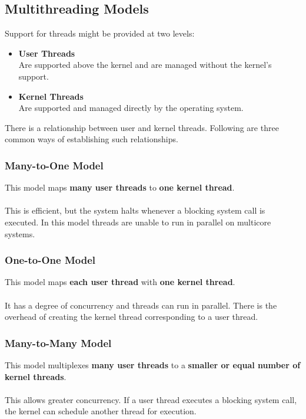 \documentclass{article}
\begin{document}
\subsection{Multithreading Models}
Support for threads might be provided at two levels:

\begin{itemize}
	\item \textbf{User Threads}
	\vspace{.2cm} \\
	Are supported above the kernel and are managed without the kernel's support.
	
	\item \textbf{Kernel Threads}
	\vspace{.2cm} \\
	Are supported and managed directly by the operating system.
\end{itemize}
There is a relationship between user and kernel threads. Following are three common ways of establishing such relationships.

\subsubsection{Many-to-One Model}
This model maps \textbf{many user threads} to \textbf{one kernel thread}. \\ \\
This is efficient, but the system halts whenever a blocking system call is executed. In this model threads are unable to run in parallel on multicore systems.

\subsubsection{One-to-One Model}
This model maps \textbf{each user thread} with \textbf{one kernel thread}. \\ \\
It has a degree of concurrency and threads can run in parallel. There is the overhead of creating the kernel thread corresponding to a user thread.

\subsubsection{Many-to-Many Model}
This model multiplexes \textbf{many user threads} to a \textbf{smaller or equal number of kernel threads}. \\ \\
This allows greater concurrency. If a user thread executes a blocking system call, the kernel can schedule another thread for execution.
\end{document}

